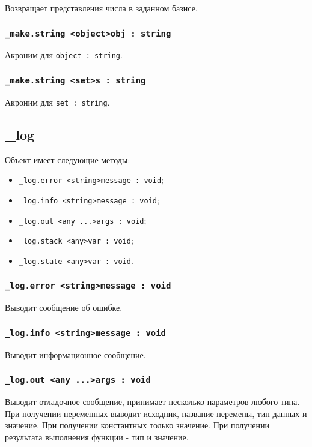 \documentclass[a4paper, 14pt]{extarticle}
\newenvironment{icItems}
	{ \begin{itemize} [noitemsep,nolistsep] }
	{ \end{itemize} }
\begin{document}
Возвращает представления числа в заданном базисе.

\subsubsection{\lstinline|_make.string <object>obj : string|}

Акроним для \lstinline|object : string|.

\subsubsection{\lstinline|_make.string <set>s : string|}

Акроним для \lstinline|set : string|.

\subsection{{\color{orange} \_log}}

Объект \logtype{} имеет следующие методы:
\begin{icItems}
	\item \lstinline|_log.error <string>message : void|;
	\item \lstinline|_log.info <string>message : void|;
	\item \lstinline|_log.out <any ...>args : void|;
	\item \lstinline|_log.stack <any>var : void|;
	\item \lstinline|_log.state <any>var : void|.
\end{icItems}

\subsubsection{\lstinline|_log.error <string>message : void|}

Выводит сообщение об ошибке.

\subsubsection{\lstinline|_log.info <string>message : void|}

Выводит информационное сообщение.

\subsubsection{\lstinline|_log.out <any ...>args : void|}

Выводит отладочное сообщение, принимает несколько параметров любого типа. При получении переменных выводит исходник, название перемены, тип данных и значение. При получении константных только значение. При получении результата выполнения функции - тип и значение. 
\end{document}
